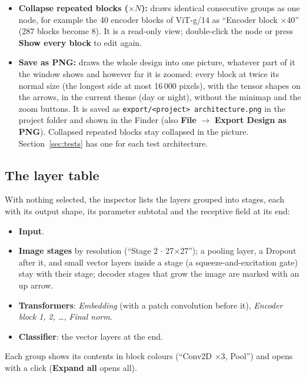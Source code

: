 \documentclass[11pt,a4paper]{article}
\newcommand{\ui}[1]{\textbf{\textsf{#1}}}
\newcommand{\file}[1]{\texttt{#1}}
\begin{document}
\begin{itemize}
        runs through the gap between rows instead; one that goes back to the left (a long design wrapped into rows) is drawn as two short
        stubs labelled with the other end (\texttt{→ 7.1}). Selecting a block draws its arrows bold and the others faint.
  \item \textbf{Collapse repeated blocks ($\times N$):} draws identical consecutive groups as one node, for example the 40 encoder blocks
        of ViT-g/14 as ``Encoder block $\times$40'' (287 blocks become 8). It is a read-only view; double-click the node or press
        \ui{Show every block} to edit again.
  \item \textbf{Save as PNG:} draws the whole design into one picture, whatever part of it the window shows and however far it is
        zoomed: every block at twice its normal size (the longest side at most 16\,000 pixels), with the tensor shapes on the arrows,
        in the current theme (day or night), without the minimap and the zoom buttons. It is saved as
        \file{export/<project> architecture.png} in the project folder and shown in the Finder (also \ui{File} $\rightarrow$
        \ui{Export Design as PNG}). Collapsed repeated blocks stay collapsed in the picture. Section~\ref{sec:tests} has one for
        each test architecture.
\end{itemize}

\subsection{The layer table}
With nothing selected, the inspector lists the layers grouped into stages, each with its output shape, its parameter subtotal and the
receptive field at its end:
\begin{itemize}
  \item \textbf{Input}.
  \item \textbf{Image stages} by resolution (``Stage 2 $\cdot$ 27$\times$27''); a pooling layer, a Dropout after it, and small vector
        layers inside a stage (a squeeze-and-excitation gate) stay with their stage; decoder stages that grow the image are marked with an
        up arrow.
  \item \textbf{Transformers}: \emph{Embedding} (with a patch convolution before it), \emph{Encoder block 1, 2, \ldots}, \emph{Final norm}.
  \item \textbf{Classifier}: the vector layers at the end.
\end{itemize}
Each group shows its contents in block colours (``Conv2D $\times$3, Pool'') and opens with a click (\ui{Expand all} opens all).
\end{document}
